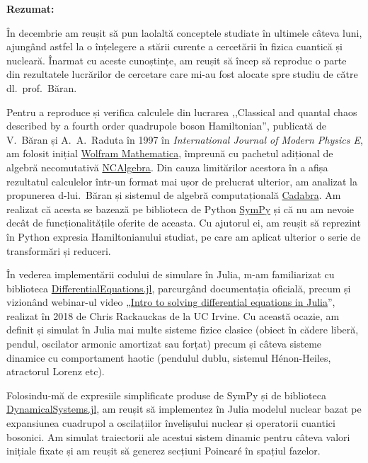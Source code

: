 
\makereportpreamble

\textbf{Rezumat:} 

În decembrie am reușit să pun laolaltă conceptele studiate în ultimele câteva luni, ajungând astfel la o înțelegere a stării curente a cercetării în fizica cuantică și nucleară. Înarmat cu aceste cunoștințe, am reușit să încep să reproduc o parte din rezultatele lucrărilor de cercetare care mi-au fost alocate spre studiu de către dl.~prof.~Băran.

Pentru a reproduce și verifica calculele din lucrarea ,,Classical and quantal chaos described by a fourth order quadrupole boson Hamiltonian'', publicată de V.~Băran și A.~A.~Raduta în 1997 în \textit{International Journal of Modern Physics E}, am folosit inițial \href{https://www.wolfram.com/mathematica/}{Wolfram Mathematica}, împreună cu pachetul adițional de algebră necomutativă \href{https://github.com/NCAlgebra/NC}{NCAlgebra}. Din cauza limitărilor acestora în a afișa rezultatul calculelor într-un format mai ușor de prelucrat ulterior, am analizat la propunerea d-lui.~Băran și sistemul de algebră computațională \href{https://cadabra.science/}{Cadabra}. Am realizat că acesta se bazează pe biblioteca de Python \href{https://www.sympy.org/en/index.html}{SymPy} și că nu am nevoie decât de funcționalitățile oferite de aceasta. Cu ajutorul ei, am reușit să reprezint în Python expresia Hamiltonianului studiat, pe care am aplicat ulterior o serie de transformări și reduceri.

În vederea implementării codului de simulare în Julia, m-am familiarizat cu biblioteca \href{https://docs.sciml.ai/DiffEqDocs/stable/}{DifferentialEquations.jl}, parcurgând documentația oficială, precum și vizionând webinar-ul video „\href{https://www.youtube.com/watch?v=KPEqYtEd-zY&feature=youtu.be}{Intro to solving differential equations in Julia}”, realizat în 2018 de Chris Rackauckas de la UC Irvine. Cu această ocazie, am definit și simulat în Julia mai multe sisteme fizice clasice (obiect în cădere liberă, pendul, oscilator armonic amortizat sau forțat) precum și câteva sisteme dinamice cu comportament haotic (pendulul dublu, sistemul Hénon-Heiles, atractorul Lorenz etc).

Folosindu-mă de expresiile simplificate produse de SymPy și de biblioteca \href{https://juliadynamics.github.io/DynamicalSystems.jl/dev/}{DynamicalSystems.jl}, am reușit să implementez în Julia modelul nuclear bazat pe expansiunea cuadrupol a oscilațiilor învelișului nuclear și operatorii cuantici bosonici. Am simulat traiectorii ale acestui sistem dinamic pentru câteva valori inițiale fixate și am reușit să generez secțiuni Poincaré în spațiul fazelor.


